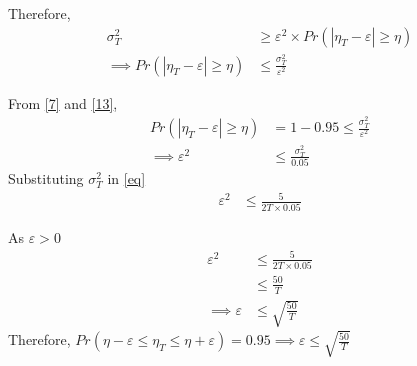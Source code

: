\documentclass{beamer}
\begin{document}
\begin{frame}{}
    Therefore,
    \begin{align}
        \sigma_T^2 &\geq \varepsilon^2 \times Pr(|\eta_T-\varepsilon|\geq \eta)\\
        \implies Pr(|\eta_T-\varepsilon|\geq \eta) &\leq \frac{\sigma_T^2}{ \varepsilon^2} \label{13}
    \end{align} 

    From \eqref{7} and \eqref{13},
    \begin{align}
        Pr(|\eta_T-\varepsilon|\geq \eta) &= 1-0.95 \leq\frac{\sigma_T^2}{ \varepsilon^2} \\
        \implies\varepsilon^2 &\leq\frac{\sigma_T^2}{0.05}\label{eq}
    \end{align}
    Substituting $\sigma_T^2$ in \eqref{eq}
    \begin{align}
        \varepsilon^2 &\leq\frac{5}{2T\times 0.05}
    \end{align}
\end{frame}

\begin{frame}{}
    As $\varepsilon>0$
    \begin{align}
        \varepsilon^2 &\leq\frac{5}{2T\times 0.05}\\
        &\leq \frac{50}{T}\\
        \implies \varepsilon &\leq \sqrt{\frac{50}{T}}
    \end{align}
Therefore, $Pr(\eta - \varepsilon \leq \eta_T \leq \eta + \varepsilon) = 0.95 \implies \varepsilon \leq \sqrt{\frac{50}{T}}$
\end{frame}
\end{document}
